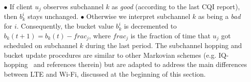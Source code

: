 \vskip 2pt
\noindent $\bullet$ If client $u_j$ observes subchannel $k$ as \emph{good} (according to the last CQI report), then $b^{i}_{k}$ stays unchanged.
\vskip 2pt
\noindent $\bullet$ Otherwise we interpret subchannel $k$ as being a \emph{bad} for \eNB $i$. Consequently, the bucket value $b^{i}_{k}$ is decremented to $b_k(t+1) = b_k(t) - frac_j$, where $frac_j$ is the fraction of time that $u_j$ got scheduled on subchannel $k$ during the last period. 
\vskip 2pt
The subchannel hopping and bucket update procedures are similar to other Markovian schemes (e.g. IQ-hopping~\cite{iqhop} and references therein) but are adapted to address the main differences between LTE and Wi-Fi, discussed at the beginning of this section.






